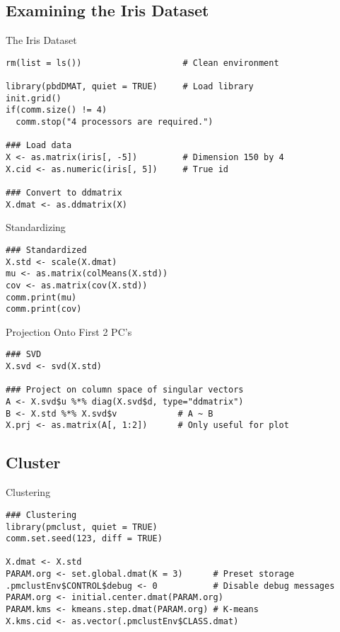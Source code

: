 \subsection{Examining the Iris Dataset}

\begin{frame}[fragile]
  \begin{block}{The Iris Dataset}\pause
\begin{lstlisting}
rm(list = ls())                    # Clean environment

library(pbdDMAT, quiet = TRUE)     # Load library
init.grid()
if(comm.size() != 4)
  comm.stop("4 processors are required.")

### Load data
X <- as.matrix(iris[, -5])         # Dimension 150 by 4
X.cid <- as.numeric(iris[, 5])     # True id

### Convert to ddmatrix
X.dmat <- as.ddmatrix(X)
\end{lstlisting}
\end{block}
\end{frame}


\begin{frame}[fragile]
  \begin{block}{Standardizing}\pause
\begin{lstlisting}
### Standardized
X.std <- scale(X.dmat)
mu <- as.matrix(colMeans(X.std))
cov <- as.matrix(cov(X.std))
comm.print(mu)
comm.print(cov)
\end{lstlisting}
\end{block}
\end{frame}

\begin{frame}[fragile]
  \begin{block}{Projection Onto First 2 PC's}\pause
\begin{lstlisting}
### SVD
X.svd <- svd(X.std)

### Project on column space of singular vectors
A <- X.svd$u %*% diag(X.svd$d, type="ddmatrix")
B <- X.std %*% X.svd$v            # A ~ B
X.prj <- as.matrix(A[, 1:2])      # Only useful for plot
\end{lstlisting}
\end{block}
\end{frame}

\subsection{Cluster}

\begin{frame}[fragile]
  \begin{block}{Clustering}\pause
\begin{lstlisting}
### Clustering
library(pmclust, quiet = TRUE)
comm.set.seed(123, diff = TRUE)

X.dmat <- X.std
PARAM.org <- set.global.dmat(K = 3)      # Preset storage
.pmclustEnv$CONTROL$debug <- 0           # Disable debug messages
PARAM.org <- initial.center.dmat(PARAM.org)
PARAM.kms <- kmeans.step.dmat(PARAM.org) # K-means
X.kms.cid <- as.vector(.pmclustEnv$CLASS.dmat)
\end{lstlisting}
\end{block}
\end{frame}

